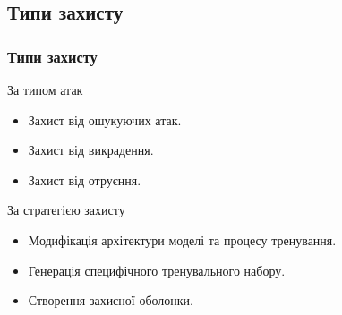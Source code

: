 \documentclass{beamer}
\numberwithin{equation}{section}
\begin{document}
	\subsection{Типи захисту}
	\begin{frame}
		\frametitle{Типи захисту}
		\begin{block} {За типом атак} 
			\begin{itemize}
				\item Захист від ошукуючих атак.
				\item Захист від викрадення.
				\item Захист від отруєння.
			\end{itemize}
		\end{block}
		\vspace{.5cm}
		\begin{block} {За стратегією захисту}
			\begin{itemize}
				\item Модифікація архітектури моделі та процесу тренування.
				\item Генерація специфічного тренувального набору.
				\item Створення захисної оболонки.
			\end{itemize}
		\end{block}	
	\end{frame}

	
\end{document}
